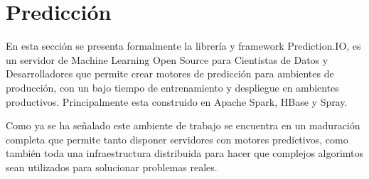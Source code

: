 

\section{Predicción }

  	
  En esta sección se presenta formalmente la librería y framework Prediction.IO, %
  es un servidor de Machine Learning Open Source para Cientistas de Datos y Desarrolladores que permite
  crear motores de predicción para ambientes de producción, con un bajo tiempo de entrenamiento y despliegue en ambientes productivos. Principalmente esta construido en Apache Spark, HBase y Spray.

  Como ya se ha señalado este ambiente de trabajo se encuentra en un maduración completa que permite tanto disponer
  servidores con motores predictivos, como también toda una infraestructura distribuida para hacer que complejos algorimtos sean utilizados para solucionar problemas reales.

















